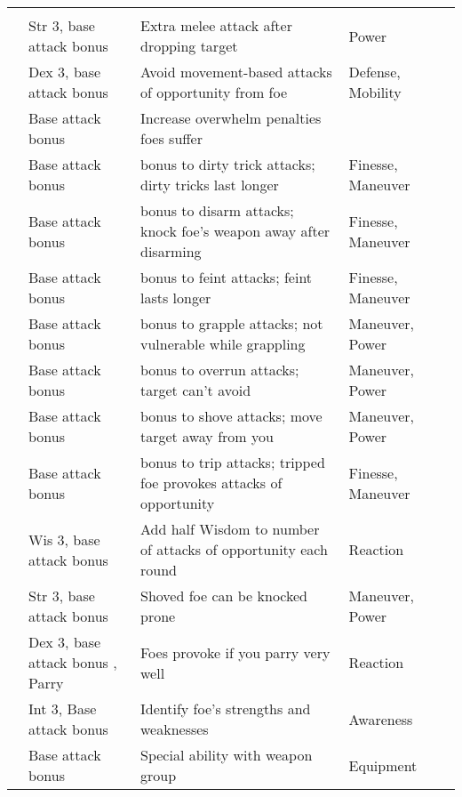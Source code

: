 {\begin{longtabu}{>{\lcol}p{10em} >{\lcol}p{15em} >{\lcol}X >{\lcol}p{6em} >{\lcol}p{3em}}
        \midrule
         &  &  &  &  \\
         & Str 3, base attack bonus  & Extra melee attack after dropping target & Power &  \\
         & Dex 3, base attack bonus  & Avoid movement-based attacks of opportunity from foe & Defense, Mobility &  \\
         & Base attack bonus  & Increase overwhelm penalties foes suffer & \x &  \\
         & Base attack bonus  &  bonus to dirty trick attacks; dirty tricks last longer & Finesse, Maneuver &  \\
         & Base attack bonus  &  bonus to disarm attacks; knock foe's weapon away after disarming & Finesse, Maneuver &  \\
         & Base attack bonus  &  bonus to feint attacks; feint lasts longer & Finesse, Maneuver &  \\
         & Base attack bonus  &  bonus to grapple attacks; not vulnerable while grappling & Maneuver, Power &  \\
         & Base attack bonus  &  bonus to overrun attacks; target can't avoid & Maneuver, Power &  \\
         & Base attack bonus  &  bonus to shove attacks; move target away from you & Maneuver, Power &  \\
         & Base attack bonus  &  bonus to trip attacks; tripped foe provokes attacks of opportunity & Finesse, Maneuver &  \\
         & Wis 3, base attack bonus  & Add half Wisdom to number of attacks of opportunity each round & Reaction &  \\
         & Str 3, base attack bonus  & Shoved foe can be knocked prone & Maneuver, Power &  \\
         & Dex 3, base attack bonus , Parry & Foes provoke if you parry very well & Reaction &  \\
         & Int 3, Base attack bonus  & Identify foe's strengths and weaknesses & Awareness &  \\
         & Base attack bonus  & Special ability with weapon group & Equipment &  \\


\end{longtabu}}
